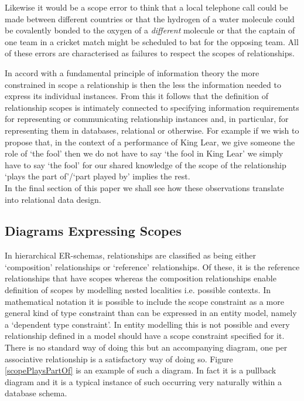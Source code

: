 \documentclass[10pt,a4paper]{article}
\begin{document}

\noindent Likewise it would be a scope error to think that a local telephone call could be made between different countries or that the hydrogen of a water molecule could be covalently bonded to the oxygen of a \textit{different} molecule or that the captain of one team in a cricket match might be scheduled to bat for the opposing team. All of these errors are characterised as failures to respect the scopes of relationships. \\



\noindent In accord with a fundamental principle of information theory the more constrained in scope a relationship is then the less the information needed to express its individual instances. From this it follows that the definition of relationship scopes is intimately connected to specifying information requirements for representing or communicating relationship instances and, in particular,  for representing them in databases, relational or otherwise. For example if we wish to propose that, in the context of a performance of King Lear, we  give someone the role of `the fool' then we do not have to say `the fool in King Lear' we simply have to say `the fool' for our shared knowledge of the scope of the relationship `plays the part of'/`part played by' implies the rest. \\

\noindent In the final section of this paper we shall see how these observations translate into relational data design.

\subsection{Diagrams Expressing Scopes}

\noindent In hierarchical ER-schemas, relationships are classified as being either `composition' relationships or `reference' relationships. Of these, it is the reference relationships that have scopes
whereas the composition relationships enable definition of scopes by modelling nested localities i.e. possible contexts. 
In mathematical notation it is possible to include the scope constraint as a more general kind of type constraint than can be expressed in an entity model, namely a `dependent type constraint'. In entity modelling this is not possible and every relationship defined in a model should have a scope constraint specified for it. There is no standard way of doing this but an accompanying diagram, one per associative relationship is a satisfactory way of doing so. Figure \ref{scopePlaysPartOf} is an example of such a diagram. In fact it is a pullback diagram and it is a typical instance of such occurring very naturally within a database schema.   \\
\end{document}

